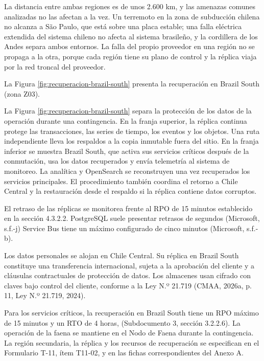 \documentclass[subdoc]{../../comun/overfore}
\begin{document}
La distancia entre ambas regiones es de unos 2.600 km, y las amenazas comunes analizadas no las afectan a la vez. Un terremoto en la zona de subducción chilena no alcanza a São Paulo, que está sobre una placa estable; una falla eléctrica extendida del sistema chileno no afecta al sistema brasileño, y la cordillera de los Andes separa ambos entornos. La falla del propio proveedor en una región no se propaga a la otra, porque cada región tiene su plano de control y la réplica viaja por la red troncal del proveedor.

La Figura \ref{fig:recuperacion-brazil-south} presenta la recuperación en Brazil South (zona Z03).

La Figura \ref{fig:recuperacion-brazil-south} separa la protección de los datos de la operación durante una contingencia. En la franja superior, la réplica continua protege las transacciones, las series de tiempo, los eventos y los objetos. Una ruta independiente lleva los respaldos a la copia inmutable fuera del sitio. En la franja inferior se muestra Brazil South, que activa sus servicios críticos después de la conmutación, usa los datos recuperados y envía telemetría al sistema de monitoreo. La analítica y OpenSearch se reconstruyen una vez recuperados los servicios principales. El procedimiento también coordina el retorno a Chile Central y la restauración desde el respaldo si la réplica contiene datos corruptos.

El retraso de las réplicas se monitorea frente al RPO de 15 minutos establecido en la sección 4.3.2.2. PostgreSQL suele presentar retrasos de segundos (Microsoft, s.f.-j) Service Bus tiene un máximo configurado de cinco minutos (Microsoft, s.f.-b).

Los datos personales se alojan en Chile Central. Su réplica en Brazil South constituye una transferencia internacional, sujeta a la aprobación del cliente y a cláusulas contractuales de protección de datos. Los almacenes usan cifrado con claves bajo control del cliente, conforme a la Ley N.º 21.719 (CMAA, 2026a, p. 11, Ley N.º 21.719, 2024).

Para los servicios críticos, la recuperación en Brazil South tiene un RPO máximo de 15 minutos y un RTO de 4 horas, (Subdocumento 3, sección 3.2.2.6). La operación de la faena se mantiene en el Nodo de Faena durante la contingencia. La región secundaria, la réplica y los recursos de recuperación se especifican en el Formulario T-11, ítem T11-02, y en las fichas correspondientes del Anexo A.
\end{document}
